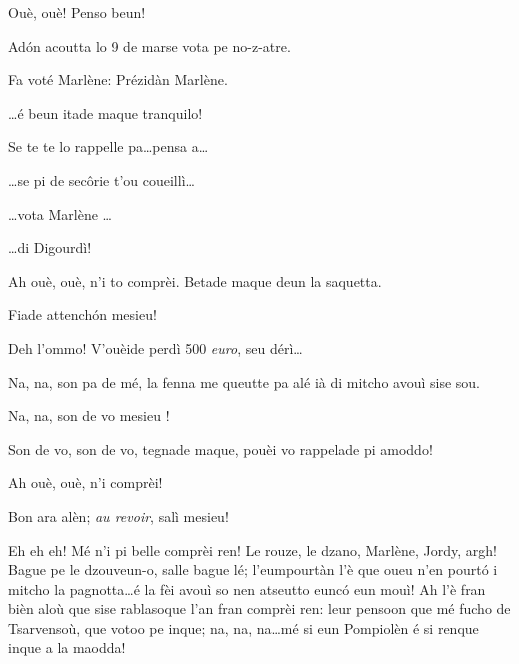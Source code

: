 \begin{drama}
\Pompiolenspeaks Ouè, ouè! Penso beun!

\Dallasspeaks Ad\'on acoutta  lo 9 de marse vota pe no-z-atre.

\Joellespeaks Fa voté Marlène: Prézidàn Marlène.

\Pompiolenspeaks \ldots é beun itade maque tranquilo!

\Dallasspeaks Se te te lo rappelle pa\ldots pensa a\ldots

\Joellespeaks \ldots se pi de sec\^orie t'ou coueillì\ldots

\Dallasspeaks \ldots vota Marlène \ldots

\Joellespeaks  \ldots di Digourdì!


\Pompiolenspeaks Ah ouè, ouè, n'i to comprèi. Betade maque deun la saquetta.


\Joellespeaks  Fiade attench\'on mesieu!

\Dallasspeaks Deh l'ommo! V'ouèide perdì 500 \textit{euro}, seu dérì\ldots

\Pompiolenspeaks Na, na, son pa de mé, la fenna me queutte pa alé ià di mitcho avouì sise sou.

\Dallasspeaks Na, na, son de vo mesieu \ok !


\Dallasspeaks Son de vo, son de vo, tegnade maque, pouèi vo rappelade pi amoddo!

\Pompiolenspeaks {} Ah ouè, ouè, n'i comprèi!

\Joellespeaks Bon ara alèn; \textit{au revoir}, salì mesieu!


\Pompiolenspeaks {} Eh eh eh!  Mé n'i pi belle comprèi ren! Le rouze, le dzano, Marlène, Jordy, argh! Bague pe le dzouveun-o, salle bague lé; l'eumpourtàn l'è que oueu n'en pourt\'o i mitcho la pagnotta\ldots é la fèi avouì so  nen atseutto eunc\'o eun mouì! Ah l'è fran bièn aloù que sise rablasoque l'an fran comprèi ren: leur pensoon que mé fucho de Tsarvensoù, que votoo pe inque; na, na, na\ldots mé si eun Pompiolèn é si renque inque a la maodda!


\end{drama}

